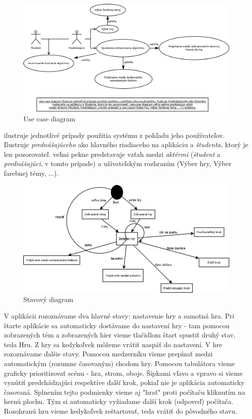 \documentclass{article}
\begin{document}
\begin{figure}[H]
	\centering
	\includegraphics[width=\textwidth]{images/use_case-diagram.png}
	\caption{Use case diagram}
	\label{fig:usecase}
\end{figure}
 ilustruje jednotlivé prípady použitia systému z pohľadu jeho používateľov. Ilustruje \emph{prednášajúceho} ako hlavného riadiaceho na aplikáciu a \emph{študenta}, ktorý je len pozorovateľ.  veľmi pekne predstavuje vzťah medzi \emph{aktérmi} (\emph{študent} a \emph{prednášajúci}, v tomto prípade) a užívateľským rozhraním (Výber hry, Výber farebnej témy, ...).

\begin{figure}[H]
	\centering
	\includegraphics[width=\textwidth]{images/state-diagram.png}
	\caption{Stavový diagram}
	\label{fig:state}
\end{figure}
V aplikácii rozoznávame dva hlavné stavy: nastavenie hry a samotná hra.
Pri štarte aplikácie sa automaticky dostávame do nastavení hry - tam pomocou zobrazených tém a zobrazených hier vieme tlačidlom štart spustiť druhý stav, teda Hru. Z hry sa kedykoľvek môžeme vrátiť naspäť do nastavení. V hre rozoznávame ďalšie stavy. Pomocou medzerníku vieme prepínať medzi automatickým (rozumne časovaným) chodom hry. Pomocou tabulátora vieme graficky prioritizovať scénu - hra, strom, oboje. Šípkami vľavo a vpravo si vieme vynútiť predchádzajúci respektíve ďalší krok, pokiaľ nie je aplikácia automaticky časovaná. Splnením tejto podmienky vieme aj "hrať" proti počítaču kliknutím na hernú plochu. Tým si automaticky vyžiadame ďalší krok (odpoveď) počítača. Rozohranú hru vieme kedykoľvek reštartovať, teda vrátiť do pôvodného stavu.
\end{document}
